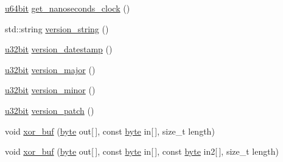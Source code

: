 \begin{DoxyCompactItemize}
\item 
\hyperlink{namespaceBotan_a634063d9fb05e25262ca94ed927030f6}{u64bit} \hyperlink{namespaceBotan_a19dc85d943018b5b723046f68c96f5b6}{get\-\_\-nanoseconds\-\_\-clock} ()
\item 
std\-::string \hyperlink{namespaceBotan_a2694767ec624b16f909609a3486744c2}{version\-\_\-string} ()
\item 
\hyperlink{namespaceBotan_aacc7d03c95e97e76168fc1c819031830}{u32bit} \hyperlink{namespaceBotan_a016ece4183f967295bdc54627bb40821}{version\-\_\-datestamp} ()
\item 
\hyperlink{namespaceBotan_aacc7d03c95e97e76168fc1c819031830}{u32bit} \hyperlink{namespaceBotan_aabb4daff37f972c506e60c513fc1e3a0}{version\-\_\-major} ()
\item 
\hyperlink{namespaceBotan_aacc7d03c95e97e76168fc1c819031830}{u32bit} \hyperlink{namespaceBotan_a236c399c212da351bc9366f1c7570da7}{version\-\_\-minor} ()
\item 
\hyperlink{namespaceBotan_aacc7d03c95e97e76168fc1c819031830}{u32bit} \hyperlink{namespaceBotan_a699eb8a6d06e1b3512432e148cba01a4}{version\-\_\-patch} ()
\item 
void \hyperlink{namespaceBotan_a816fe9562270a9a8a4abf0b39391bcfe}{xor\-\_\-buf} (\hyperlink{namespaceBotan_a7d793989d801281df48c6b19616b8b84}{byte} out\mbox{[}$\,$\mbox{]}, const \hyperlink{namespaceBotan_a7d793989d801281df48c6b19616b8b84}{byte} in\mbox{[}$\,$\mbox{]}, size\-\_\-t length)
\item 
void \hyperlink{namespaceBotan_af151e8c111ba409c9a0aced905c5c4a4}{xor\-\_\-buf} (\hyperlink{namespaceBotan_a7d793989d801281df48c6b19616b8b84}{byte} out\mbox{[}$\,$\mbox{]}, const \hyperlink{namespaceBotan_a7d793989d801281df48c6b19616b8b84}{byte} in\mbox{[}$\,$\mbox{]}, const \hyperlink{namespaceBotan_a7d793989d801281df48c6b19616b8b84}{byte} in2\mbox{[}$\,$\mbox{]}, size\-\_\-t length)
\end{DoxyCompactItemize}
